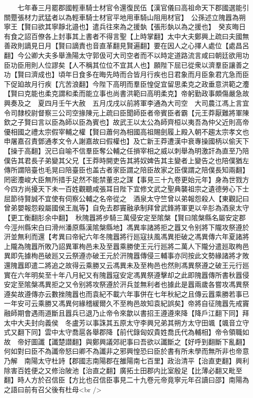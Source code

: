 　　七年春三月罷郡國輕車騎士材官令還復民伍【漢官儀曰高祖命天下郡國選能引關蹷張材力武猛者以為輕車騎士材官平地用車騎山阻用材官】　公孫述立隗囂為朔寧王【賢曰欲其寧靜北邉也】遣兵往來為之援埶【張形埶以為之援也】　癸亥晦日有食之詔百僚各上封事其上書者不得言聖【上時掌翻】太中大夫鄭興上疏曰夫國無善政則謫見日月【賢曰謫責也音直革翻見賢遍翻】要在因人之心擇人處位【處昌呂翻】今公卿大夫多舉漁陽太守郭伋可大司空者而不以時定道路流言咸曰朝廷欲用功臣功臣用則人位謬矣【人不稱其位位不宜其人也】願陛下屈已從衆以濟羣臣讓善之功【賢曰濟成也】頃年日食多在晦先時而合皆月行疾也日君象而月臣象君亢急而臣下促廹故月行疾【亢苦浪翻】今陛下高明而羣臣惶促宜留思柔克之政垂意洪範之灋【賢曰克能也柔克謂和柔而能立事也尚書洪範曰高明柔克】帝躬勤政事頗傷嚴急故興奏及之　夏四月壬午大赦　五月戊戌以前將軍李通為大司空　大司農江馮上言宜令司隸校尉督察三公司空掾陳元上疏曰臣聞師臣者帝賓臣者霸【元王莽厭難將軍陳欽之子賢曰言以臣為師以臣為賓也】故武王以太公為師齊桓以夷吾為仲父近則高帝優相國之禮太宗假宰輔之權【賢曰蕭何為相國高祖賜劍履上殿入朝不趨太宗孝文也申屠嘉召責鄧通孝文令人謝嘉故曰假權也】及亡新王莽遭漢中衰專操國柄以偷天下【操于高翻】況已自喻不信羣臣奪公輔之任損宰相之威以刺舉為明激訐為直至乃陪僕告其君長子弟變其父兄【王莽時開吏告其將奴婢告其主變者上變告之也陪僕猶左傳所謂陪臺也毛晃曰陪臺臣也盖古者家臣謂之陪臣故家之臣僕謂之陪僕長知兩翻】罔密灋峻大臣無所措手足然不能禁董忠之謀【事見三十九卷更始元年】身為世戮方今四方尚擾天下未一百姓觀聽咸張耳目陛下宜修文武之聖典襲祖宗之遺德勞心下士屈節待賢誠不宜使有伺察公輔之名帝從之　酒泉太守竺曾以弟報怨殺人【東觀記曰曾弟嬰報怨殺屬國侯王胤等】自免去郡竇融承制拜曾武鋒將軍更以辛肜為酒泉太守【更工衡翻肜余中翻】　秋隗囂將步騎三萬侵安定至隂槃【賢曰隂槃縣名屬安定郡今涇州縣宋白曰滑州潘原縣漢隂槃縣地】馮異率諸將拒之囂又令别將下隴攻祭遵於汧並無利而還【考異曰帝紀六年冬隗囂將行廵寇扶風馮異拒破之馮異傳六年夏諸將上隴為隗囂所敗乃詔異軍栒邑未及至囂乘勝使王元行廵將二萬人下隴分遣廵取栒邑異即先據栒邑破廵又云祭遵亦破王元於汧隗囂傳侵三輔事亦同按此文勢緣諸將才敗還隗囂即遣二將追之故得云乘勝又云馮異未及至栒邑也然則馮異祭遵之破王元行廵實在六年明矣至十年八月紀又有隗囂寇安定馮異祭遵擊却之此即隗囂傳所書秋囂侵安定至隂槃馮異拒之又令别將攻祭遵於汧兵並無利者也據此是囂兩歲各嘗攻馮異祭遵矣故遵傳亦云數挫隗囂也而袁紀不載六年事併在七年秋紀之且傳云囂乘勝若事已一年安可云乘勝又馮異何緣稽緩爾久不至栒邑故知袁紀誤矣】帝將自征隗囂先戒竇融師期會遇雨道斷且囂兵已退乃止帝令來歙以書招王遵遵來降【降戶江翻下同】拜太中大夫封向義侯　冬盧芳以事誅其五原太守李興兄弟其朔方太守田颯【颯音立守式又翻下同】雲中太守喬扈各舉郡降【前代錄匈奴貴姓喬氏代為輔相】帝令領職如故　帝好圖讖【讖楚譛翻】與鄭興議郊祀事曰吾欲以讖斷之【好呼到翻斷下亂翻】何如對曰臣不為讖帝怒曰卿不為讖非之邪興惶恐曰臣於書有所未學而無所非也帝意乃解　南陽太守杜詩【郡國志南陽郡在雒陽南七百里】政治清平【治直吏翻】興利除害百姓便之又修治陂池【治直之翻】廣拓土田郡内比室殷足【比薄必翻又毗至翻】時人方於召信臣【方比也召信臣事見二十九卷元帝竟寧元年召讀曰邵】南陽為之語曰前有召父後有杜母<br />
